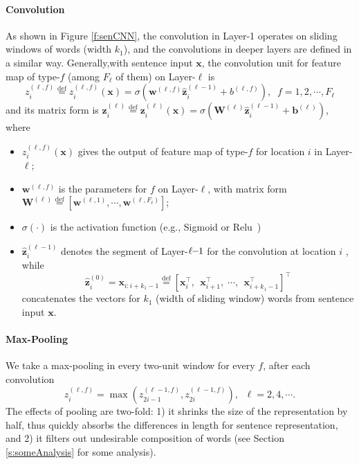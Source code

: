 \documentclass{article} \usepackage{nips14submit_e,times}
\newcommand{\W}{\ensuremath{\mathbf{W}}}
\renewcommand{\b}{\ensuremath{\mathbf{b}}}
\newcommand{\w}{\ensuremath{\mathbf{w}}}
\newcommand{\x}{\ensuremath{\mathbf{x}}}
\newcommand{\z}{\ensuremath{\mathbf{z}}}
\newcommand{\0}{\ensuremath{\mathbf{0}}}
\newcommand{\1}{\ensuremath{\mathbf{1}}}
\begin{document}
\paragraph{Convolution} \vspace{-10pt} \label{s:convunit}
As shown in Figure \ref{f:senCNN}, the convolution in Layer-1 operates on sliding windows of words (width $k_1$), and the convolutions in deeper layers are defined in a similar way. Generally,with sentence input $\mathbf{x}$, the convolution unit for feature map of type-$f$ (among $F_\ell$ of them)  on Layer-$\ell$ is
\begin{equation}
z^{(\ell, f)}_{i} \overset{\text{def}}{=}
z^{(\ell,f)}_{i}(\mathbf{x}) =  \sigma(\w^{(\ell,f)} \hat{\mathbf{z}}^{(\ell-1)}_{i} + b^{(\ell,f)}), \;\; f = 1,2,\cdots,F_{\ell}
\end{equation}
and its matrix form is $\z^{(\ell)}_{i} \overset{\text{def}}{=}\z^{(\ell)}_{i}(\mathbf{x}) =
 \sigma(\W^{(\ell)} \hat{\mathbf{z}}^{(\ell-1)}_{i} + \b^{(\ell)})$,
where
\begin{itemize}
  \item $z^{(\ell,f)}_{i}(\mathbf{x})$ gives the output of feature map of type-$f$  for location $i$ in Layer-$\ell$;
   \item $\w^{(\ell, f)}$ is the parameters for $f$ on Layer-$\ell$, with matrix form $\W^{(\ell)} \overset{\text{def}}{=} [\w^{(\ell,1)},\cdots,\w^{(\ell,F_{\ell})}] $;
   \item $\sigma(\cdot)$ is the activation function (e.g., Sigmoid or Relu~\cite{relu})
  \item $\hat{\mathbf{z}}^{(\ell-1)}_{i}$ denotes the segment of Layer-$\ell\hspace{-3pt}-\hspace{-3pt}1$ for the convolution at location $i$ , while
      \[
      \hat{\mathbf{z}}^{(0)}_{i} =  \x_{i:i+k_1-1} \overset{\text{def}}{=}  [ \x_{i}^\top, \;\, \x_{i+1}^\top,\;\cdots,\;\, \x_{i+k_1-1}^\top]^\top
      \]
      concatenates the vectors for $k_{1}$ (width of sliding window) words from sentence input $\mathbf{x}$.
\end{itemize}


\paragraph{Max-Pooling}\vspace{-10pt}
We take a max-pooling in every two-unit window for every $f$, after each convolution
\[
z_i^{(\ell,f)} = \max(z_{2i-1}^{(\ell-1,f)}, z_{2i}^{(\ell-1,f)}), \;\;\ell = 2,4,\cdots.
\]
The effects of pooling are two-fold: 1) it shrinks the size of the representation by half, thus quickly absorbs the differences in length for sentence representation, and 2) it filters out undesirable composition of words (see Section \ref{s:someAnalysis} for some analysis).
\end{document}
